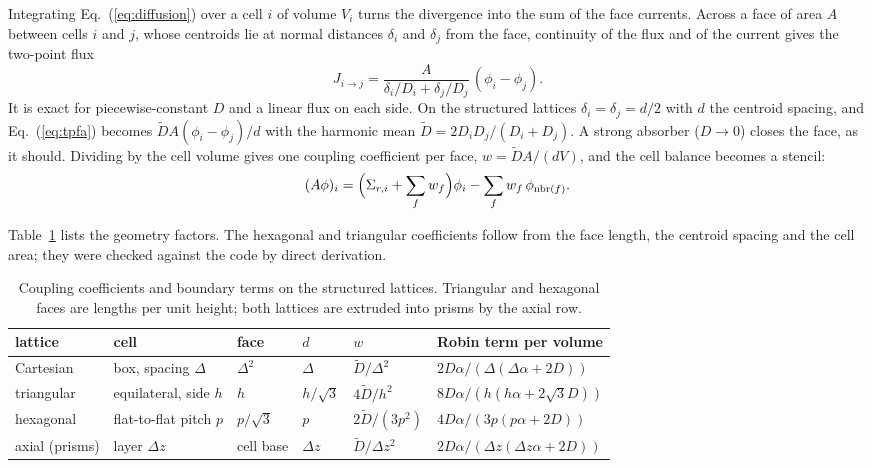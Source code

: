 \documentclass[a4paper,10pt]{article}
\newcommand{\Dt}{\tilde D}
\begin{document}
Integrating Eq.~(\ref{eq:diffusion}) over a cell $i$ of volume $V_i$ turns the
divergence into the sum of the face currents. Across a face of area $A$ between
cells $i$ and $j$, whose centroids lie at normal distances $\delta_i$ and
$\delta_j$ from the face, continuity of the flux and of the current gives the
two-point flux
\begin{equation}
J_{i\to j} = \frac{A}{\delta_i/D_i + \delta_j/D_j}\,(\phi_i - \phi_j).
\label{eq:tpfa}
\end{equation}
It is exact for piecewise-constant $D$ and a linear flux on each side. On the
structured lattices $\delta_i = \delta_j = d/2$ with $d$ the centroid spacing,
and Eq.~(\ref{eq:tpfa}) becomes $\Dt A(\phi_i-\phi_j)/d$ with the harmonic mean
$\Dt = 2D_iD_j/(D_i+D_j)$. A strong absorber ($D\to0$) closes the face, as it
should. Dividing by the cell volume gives one coupling coefficient per face,
$w = \Dt A/(dV)$, and the cell balance becomes a stencil:
\begin{equation}
(A\phi)_i = \Bigl(\Sigma_{r,i} + \sum_{f}w_f\Bigr)\phi_i - \sum_f w_f\,\phi_{\mathrm{nbr}(f)}.
\end{equation}

Table~\ref{tab:lattices} lists the geometry factors. The hexagonal and
triangular coefficients follow from the face length, the centroid spacing and
the cell area; they were checked against the code by direct derivation.

\begin{table}[htbp]
\begin{center}
\small
\begin{tabular}{llllll}
\hline
lattice & cell & face & $d$ & $w$ & Robin term per volume\\
\hline
Cartesian & box, spacing $\Delta$ & $\Delta^2$ & $\Delta$ & $\Dt/\Delta^2$ &
  $2D\alpha/(\Delta(\Delta\alpha + 2D))$\\
triangular & equilateral, side $h$ & $h$ & $h/\sqrt3$ & $4\Dt/h^2$ &
  $8D\alpha/(h(h\alpha + 2\sqrt3D))$\\
hexagonal & flat-to-flat pitch $p$ & $p/\sqrt3$ & $p$ & $2\Dt/(3p^2)$ &
  $4D\alpha/(3p(p\alpha + 2D))$\\
axial (prisms) & layer $\Delta z$ & cell base & $\Delta z$ & $\Dt/\Delta z^2$ &
  $2D\alpha/(\Delta z(\Delta z\alpha + 2D))$\\
\hline
\end{tabular}
\end{center}
\caption{Coupling coefficients and boundary terms on the structured lattices.
Triangular and hexagonal faces are lengths per unit height; both lattices are
extruded into prisms by the axial row.}
\label{tab:lattices}
\end{table}
\end{document}
